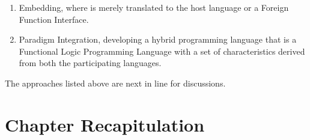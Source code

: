 \documentclass[thesis-solanki.tex]{subfiles}
\begin{document}
\begin{enumerate}
\item
  Embedding, where  is merely translated to the host language  or a Foreign
  Function Interface.

\item
  Paradigm Integration, developing a hybrid programming language that is a Functional Logic Programming Language
  with a set of characteristics derived from both the participating languages.
\end{enumerate}

The approaches listed above are next in line for discussions.  


\section{Chapter Recapitulation}
\end{document}
